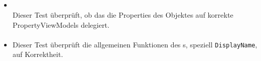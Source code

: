 \subsection{}

\paragraph{}

\begin{itemize}

\item{}~\\
Dieser Test überprüft, ob das  die Properties des Objektes auf korrekte PropertyViewModels delegiert.

\end{itemize}

\paragraph{}

\begin{itemize}

\item{}
Dieser Test überprüft die allgemeinen Funktionen des s, speziell \verb#DisplayName#, auf Korrektheit.

\end{itemize}

